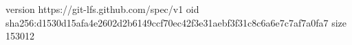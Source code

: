 version https://git-lfs.github.com/spec/v1
oid sha256:d1530d15afa4e2602d2b6149ccf70ec42f3e31aebf3f31c8c6a6e7c7af7a0fa7
size 153012
